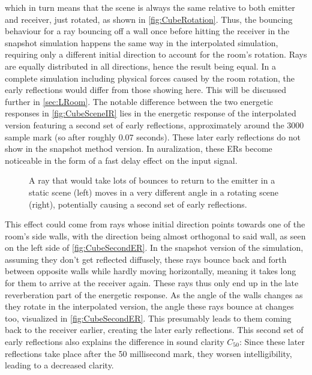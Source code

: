 which in turn means that the scene is always the same relative to both emitter and receiver, just rotated,
as shown in \autoref{fig:CubeRotation}.
\newline
Thus, the bouncing behaviour for a ray bouncing off a wall once before hitting the receiver
in the snapshot simulation happens the same way in the interpolated simulation,
requiring only a different initial direction to account for the room's rotation.
Rays are equally distributed in all directions, hence the result being equal.
\newline
In a complete simulation including physical forces caused by the room rotation,
the early reflections would differ from those showing here.
This will be discussed further in \autoref{sec:LRoom}.
\newline
The notable difference between the two energetic responses in \autoref{fig:CubeSceneIR}
lies in the energetic response of the interpolated version featuring a second set of early reflections,
approximately around the 3000 sample mark (so after roughly 0.07 seconds).
These later early reflections do not show in the snapshot method version.
In auralization, these ERs become noticeable in the form of a fast delay effect on the input signal.
\newline
\begin{figure}[t!]
    \begin{center}
        
    \end{center}
    \caption{A ray that would take lots of bounces to return to the emitter in a static scene (left) moves in a very different angle in a rotating scene (right), potentially causing a second set of early reflections.}\label{fig:CubeSecondER}
\end{figure}
This effect could come from rays whose initial direction points towards one of the room's side walls,
with the direction being almost orthogonal to said wall, as seen on the left side of \autoref{fig:CubeSecondER}.
In the snapshot version of the simulation, assuming they don't get reflected diffusely,
these rays bounce back and forth between opposite walls while hardly moving horizontally,
meaning it takes long for them to arrive at the receiver again.
These rays thus only end up in the late reverberation part of the energetic response.
\newline
As the angle of the walls changes as they rotate in the interpolated version,
the angle these rays bounce at changes too, visualized in \autoref{fig:CubeSecondER}.
This presumably leads to them coming back to the receiver earlier, creating the later early reflections.
\newline
This second set of early reflections also explains the difference in sound clarity \(C_{50}\):
Since these later reflections take place after the 50 millisecond mark,
they worsen intelligibility, leading to a decreased clarity.

